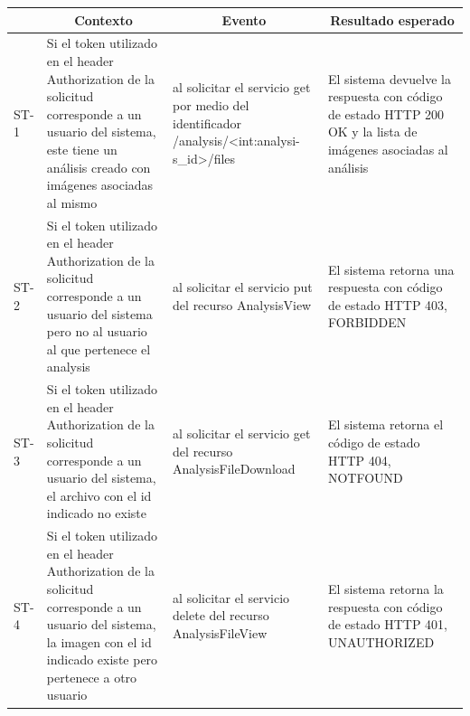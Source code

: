 \documentclass[a4paper,12pt]{article}
\begin{document}
\begin{longtable}{|p{1.0cm}|p{4cm}|p{4cm}|p{4cm}| }

	\hline
		\rowcolor[gray]{0.9} 
		\multicolumn{1}{|c}{Id test seguridad} & \multicolumn{1}{|c|}{Contexto} & \multicolumn{1}{|c|}{Evento} & \multicolumn{1}{|c|}{Resultado esperado} \\
	\hline
		ST-1 & Si el token utilizado en el header Authorization de la solicitud corresponde a un usuario del sistema, este tiene un análisis creado con imágenes asociadas al mismo  & al solicitar el servicio get por medio del identificador /analysis/<int:analysi-s\_id>/files & El sistema devuelve la respuesta con código de estado HTTP 200 OK y la lista de imágenes asociadas al análisis\\
	\hline
		ST-2 & Si el token utilizado en el header Authorization de la solicitud corresponde a un usuario del sistema pero no al usuario al que pertenece el analysis & al solicitar el servicio put del recurso AnalysisView & El sistema retorna una respuesta con código de estado HTTP 403, FORBIDDEN\\
	\hline
		ST-3 & Si el token utilizado en el header Authorization de la solicitud corresponde a un usuario del sistema, el archivo con el id indicado no existe & al solicitar el servicio get del recurso AnalysisFileDownload & El sistema retorna el código de estado HTTP 404, NOTFOUND\\
	\hline
		ST-4 & Si el token utilizado en el header Authorization de la solicitud corresponde a un usuario del sistema, la imagen con el id indicado existe pero pertenece a otro usuario  & al solicitar el servicio delete del recurso AnalysisFileView & El sistema retorna la respuesta con código de estado HTTP 401, UNAUTHORIZED\\
	\hline

\end{longtable}
\end{document}
